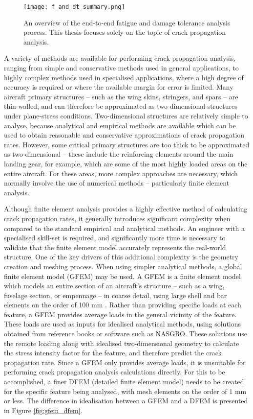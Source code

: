 \begin{figure}[H]
	\centering
	\texttt{[image: f\_and\_dt\_summary.png]}
	\caption{An overview of the end-to-end fatigue and damage tolerance analysis process. This thesis focuses solely on the topic of crack propagation analysis. \cite{gallagher_damage_2005}}
	\label{fig:f_and_dt_summary}
\end{figure}

A variety of methods are available for performing crack propagation analysis, ranging from simple and conservative methods used in general applications, to highly complex methods used in specialised applications, where a high degree of accuracy is required or where the available margin for error is limited. Many aircraft primary structures -- such as the wing skins, stringers, and spars -- are thin-walled, and can therefore be approximated as two-dimensional structures under plane-stress conditions. Two-dimensional structures are relatively simple to analyse, because analytical and empirical methods are available which can be used to obtain reasonable and conservative approximations of crack propagation rates. However, some critical primary structures are too thick to be approximated as two-dimensional -- these include the reinforcing elements around the main landing gear, for example, which are some of the most highly loaded areas on the entire aircraft. For these areas, more complex approaches are necessary, which normally involve the use of numerical methods -- particularly finite element analysis.

Although finite element analysis provides a highly effective method of calculating crack propagation rates, it generally introduces significant complexity when compared to the standard empirical and analytical methods. An engineer with a specialised skill-set is required, and significantly more time is necessary to validate that the finite element model accurately represents the real-world structure. One of the key drivers of this additional complexity is the geometry creation and meshing process. When using simpler analytical methods, a global finite element model (GFEM) may be used. A GFEM is a finite element model which models an entire section of an aircraft's structure -- such as a wing, fuselage section, or empennage -- in coarse detail, using large shell and bar elements on the order of 100 mm \cite{dharmasaroja_load_2017}. Rather than providing specific loads at each feature, a GFEM provides average loads in the general vicinity of the feature. These loads are used as inputs for idealised analytical methods, using solutions obtained from reference books or software such as NASGRO. These solutions use the remote loading along with idealised two-dimensional geometry to calculate the stress intensity factor for the feature, and therefore predict the crack propagation rate. Since a GFEM only provides average loads, it is unsuitable for performing crack propagation analysis calculations directly. For this to be accomplished, a finer DFEM (detailed finite element model) needs to be created for the specific feature being analysed, with mesh elements on the order of 1 mm or less. The difference in idealisation between a GFEM and a DFEM is presented in Figure \ref{fig:gfem_dfem}.

